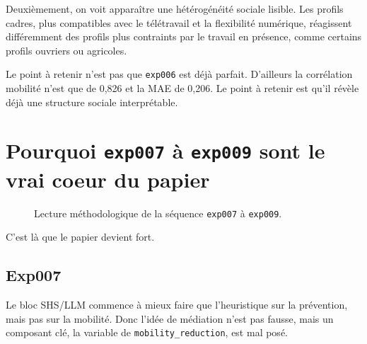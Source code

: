 \documentclass[11pt,a4paper]{article}
\begin{document}
Deuxièmement, on voit apparaître une hétérogénéité sociale lisible. Les profils cadres, plus compatibles avec le télétravail et la flexibilité numérique, réagissent différemment des profils plus contraints par le travail en présence, comme certains profils ouvriers ou agricoles.

Le point à retenir n'est pas que \texttt{exp006} est déjà parfait. D'ailleurs la corrélation mobilité n'est que de 0,826 et la MAE de 0,206. Le point à retenir est qu'il révèle déjà une structure sociale interprétable.

\section{Pourquoi \texttt{exp007} à \texttt{exp009} sont le vrai coeur du papier}

\begin{figure}[h!]
\centering
{}
\caption{Lecture méthodologique de la séquence \texttt{exp007} à \texttt{exp009}.}
\end{figure}

C'est là que le papier devient fort.

\subsection*{Exp007}
Le bloc SHS/LLM commence à mieux faire que l'heuristique sur la prévention, mais pas sur la mobilité. Donc l'idée de médiation n'est pas fausse, mais un composant clé, la variable de \texttt{mobility\_reduction}, est mal posé.
\end{document}
